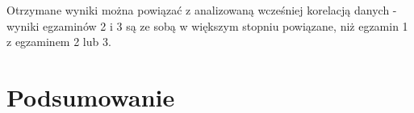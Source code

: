 \documentclass[12pt]{article}
\begin{document}
Otrzymane wyniki można powiązać z analizowaną wcześniej korelacją danych - wyniki egzaminów 2 i 3 są ze sobą w większym stopniu powiązane, niż egzamin 1 z egzaminem 2 lub 3.



\pagebreak
\section{Podsumowanie}

\pagebreak

\begin{thebibliography}{9}


\end{thebibliography}
\end{document}
